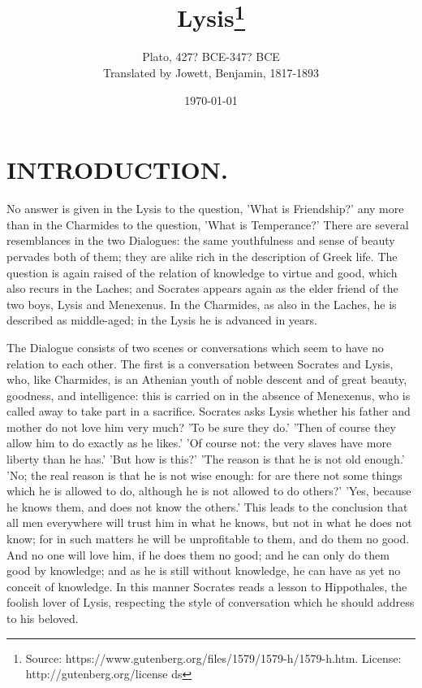 \documentclass[11pt,letter]{article}
\begin{document}
\title{Lysis\thanks{Source: https://www.gutenberg.org/files/1579/1579-h/1579-h.htm. License: http://gutenberg.org/license ds}}
\date{\today}
\author{Plato, 427? BCE-347? BCE\\ Translated by Jowett, Benjamin, 1817-1893}
\maketitle

\setcounter{tocdepth}{1}
\tableofcontents
\renewcommand{\baselinestretch}{1.0}
\normalsize
\newpage

\section{
      INTRODUCTION.
    }
\par  No answer is given in the Lysis to the question, 'What is Friendship?' any more than in the Charmides to the question, 'What is Temperance?' There are several resemblances in the two Dialogues: the same youthfulness and sense of beauty pervades both of them; they are alike rich in the description of Greek life. The question is again raised of the relation of knowledge to virtue and good, which also recurs in the Laches; and Socrates appears again as the elder friend of the two boys, Lysis and Menexenus. In the Charmides, as also in the Laches, he is described as middle-aged; in the Lysis he is advanced in years.

\par  The Dialogue consists of two scenes or conversations which seem to have no relation to each other. The first is a conversation between Socrates and Lysis, who, like Charmides, is an Athenian youth of noble descent and of great beauty, goodness, and intelligence: this is carried on in the absence of Menexenus, who is called away to take part in a sacrifice. Socrates asks Lysis whether his father and mother do not love him very much? 'To be sure they do.' 'Then of course they allow him to do exactly as he likes.' 'Of course not: the very slaves have more liberty than he has.' 'But how is this?' 'The reason is that he is not old enough.' 'No; the real reason is that he is not wise enough: for are there not some things which he is allowed to do, although he is not allowed to do others?' 'Yes, because he knows them, and does not know the others.' This leads to the conclusion that all men everywhere will trust him in what he knows, but not in what he does not know; for in such matters he will be unprofitable to them, and do them no good. And no one will love him, if he does them no good; and he can only do them good by knowledge; and as he is still without knowledge, he can have as yet no conceit of knowledge. In this manner Socrates reads a lesson to Hippothales, the foolish lover of Lysis, respecting the style of conversation which he should address to his beloved.
\end{document}
